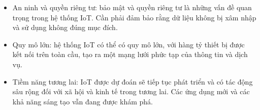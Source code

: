 \documentclass{article} %
\begin{document}
\begin{itemize}
\item An ninh và quyền riêng tư: bảo mật và quyền riêng tư là những vấn đề quan trọng trong hệ thống IoT. Cần phải đảm bảo rằng dữ liệu không bị xâm nhập và sử dụng không đúng mục đích.

\item Quy mô lớn: hệ thống IoT có thể có quy mô lớn, với hàng tỷ thiết bị được kết nối trên toàn cầu, tạo ra một mạng lưới phức tạp của thông tin và dịch vụ.

\item Tiềm năng tương lai: IoT được dự đoán sẽ tiếp tục phát triển và có tác động sâu rộng đối với xã hội và kinh tế trong tương lai. Các ứng dụng mới và các khả năng sáng tạo vẫn đang được khám phá.

\end{itemize}
\end{document}
